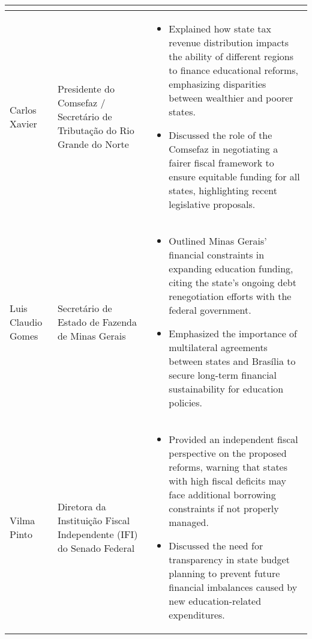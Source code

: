 \documentclass[a4paper,10pt]{article}
\begin{document}
\begin{table}[htbp!]
\begin{tabular}{|p{1.2in}|p{1.6in}|p{4.2in}|}
\begin{itemize}
		\end{itemize}\\
		\hline
		Carlos Xavier & Presidente do Comsefaz / Secretário de Tributação do Rio Grande do Norte & \begin{itemize}
			\item Explained how state tax revenue distribution impacts the ability of different regions to finance educational reforms, emphasizing disparities between wealthier and poorer states.
			\item Discussed the role of the Comsefaz in negotiating a fairer fiscal framework to ensure equitable funding for all states, highlighting recent legislative proposals.
		\end{itemize}\\
		\hline
		Luis Claudio Gomes & Secretário de Estado de Fazenda de Minas Gerais & \begin{itemize}
			\item Outlined Minas Gerais’ financial constraints in expanding education funding, citing the state’s ongoing debt renegotiation efforts with the federal government.
			\item Emphasized the importance of multilateral agreements between states and Brasília to secure long-term financial sustainability for education policies.
		\end{itemize}\\
		\hline
		Vilma Pinto & Diretora da Instituição Fiscal Independente (IFI) do Senado Federal & \begin{itemize}
			\item Provided an independent fiscal perspective on the proposed reforms, warning that states with high fiscal deficits may face additional borrowing constraints if not properly managed.
			\item Discussed the need for transparency in state budget planning to prevent future financial imbalances caused by new education-related expenditures.
		\end{itemize}\\
		\hline
	\end{tabular}
\end{table}
\end{document}
